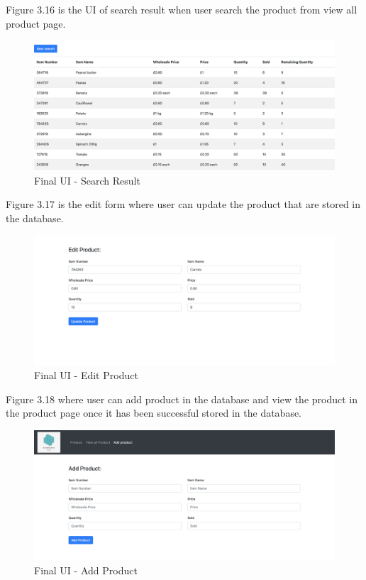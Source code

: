 Figure 3.16 is the UI of search result when user search the product from view all product page.
\begin{figure}[H]
\centering
    \includegraphics[scale=0.27]
    {FinalUI/search.png}
    \caption{Final UI - Search Result}
    \label{fig:Final UI - Search Result}
\end{figure}

Figure 3.17 is the edit form where user can update the product that are stored in the database.
\begin{figure}[H]
\centering
    \includegraphics[scale=0.3]
    {FinalUI/editproduct.png}
    \caption{Final UI - Edit Product}
    \label{fig:Final UI - Edit Product}
\end{figure}

Figure 3.18 where user can add product in the database and view the product in the product page once it has been successful stored in the database.
\begin{figure}[H]
\centering
    \includegraphics[scale=0.27]
    {FinalUI/addproduct.png}
    \caption{Final UI - Add Product}
    \label{fig:Final UI - Add Product}
\end{figure}

